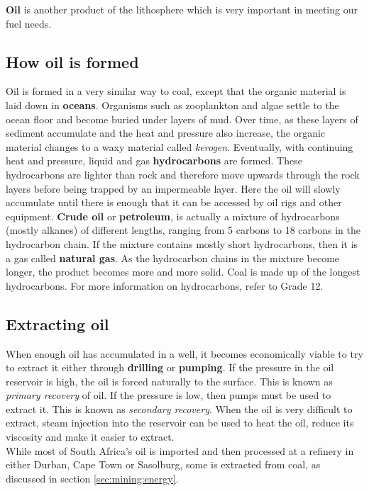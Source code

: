 \textbf{Oil} is another product of the lithosphere which is very important in meeting our fuel needs.

\subsection{How oil is formed}

Oil is formed in a very similar way to coal, except that the organic material is laid down in \textbf{oceans}. Organisms such as zooplankton and algae settle to the ocean floor and become buried under layers of mud. Over time, as these layers of sediment accumulate and the heat and pressure also increase, the organic material changes to a waxy material called \textit{kerogen}. Eventually, with continuing heat and pressure, liquid and gas \textbf{hydrocarbons} are formed. These hydrocarbons are lighter than rock and therefore move upwards through the rock layers before being trapped by an impermeable layer. Here the oil will slowly accumulate until there is enough that it can be accessed by oil rigs and other equipment. \textbf{Crude oil} or \textbf{petroleum}, is actually a mixture of hydrocarbons (mostly alkanes) of different lengths, ranging from 5 carbons to 18 carbons in the hydrocarbon chain. If the mixture contains mostly short hydrocarbons, then it is a gas called \textbf{natural gas}. As the hydrocarbon chains in the mixture become longer, the product becomes more and more solid. Coal is made up of the longest hydrocarbons. For more information on hydrocarbons, refer to Grade 12.

\subsection{Extracting oil}

When enough oil has accumulated in a well, it becomes economically viable to try to extract it either through \textbf{drilling} or \textbf{pumping}. If the pressure in the oil reservoir is high, the oil is forced naturally to the surface. This is known as \textit{primary recovery} of oil. If the pressure is low, then pumps must be used to extract it. This is known as \textit{secondary recovery}. When the oil is very difficult to extract, steam injection into the reservoir can be used to heat the oil, reduce its viscosity and make it easier to extract.\\

While most of South Africa's oil is imported and then processed at a refinery in either Durban, Cape Town or Sasolburg, some is extracted from coal, as discussed in section \ref{sec:mining:energy}.


